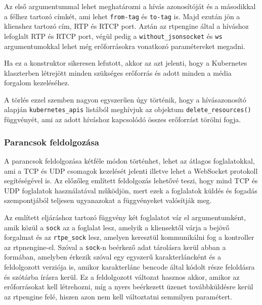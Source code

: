 Az első argumentummal lehet meghatározni a hívás azonosítóját és a másodikkal a félhez
tartozó címkét, ami lehet \texttt{from-tag} és \texttt{to-tag} is. Majd ezután jön a
klienshez tartozó cím, RTP és RTCP port. Aztán az rtpengine által a híváshoz lefoglalt
RTP és RTCP port, végül pedig a \texttt{without\_jsonsocket} és \texttt{ws} 
argumentumokkal lehet még erőforrásokra vonatkozó paramétereket megadni.

Ha ez a konstruktor sikeresen lefutott, akkor az azt jelenti, hogy a Kubernetes 
klaszterben létrejött minden szükséges erőforrás és adott minden a média forgalom 
kezeléséhez.

A törlés ezzel szemben nagyon egyszerűen úgy történik, hogy a hívásazonosító alapján
\texttt{kubernetes\_apis} listából meghívjuk az objektum \texttt{delete\_resources()}
függvényét, ami az adott híváshoz kapcsolódó összes erőforrást törölni fogja.

\subsubsection{Parancsok feldolgozása}

A parancsok feldolgozása kétféle módon történhet, lehet az átlagos foglalatokkal, ami 
a TCP és UDP csomagok kezelését jelenti illetve lehet a WebSocket protokoll segítéségével 
is. Az előzőleg említett feldolgozás lehetővé teszi, hogy mind TCP és UDP
foglalatok használatával működjön, mert ezek a foglalatok küldés és fogadás szempontjából
teljesen ugyanazokat a függvényeket valósítják meg.

Az említett eljáráshoz tartozó függvény két foglalatot vár el argumentumként, amik közül 
a \texttt{sock} az a foglalat lesz, amelyik a kliensektől várja a bejövő forgalmat és az 
\texttt{rtpe\_sock} lesz, amelyen keresztül kommunikálni fog a kontroller az 
rtpnengine-el. Szóval a \texttt{sock}-n beérkező adat tárolásra kerül abban a formában, 
amelyben érkezik szóval egy egyszerű karakterláncként és a feldolgozott verziója is, 
amikor karakterlánc bencode által kódolt része feloldásra és szótárba írásra kerül. Ez a 
feldolgozott változat hasznos akkor, amikor az erőforrásokat kell létrehozni, míg a nyers 
beérkezett üzenet továbbküldésre kerül az rtpengine felé, hiszen azon nem kell 
változtatni semmilyen paramétert.


